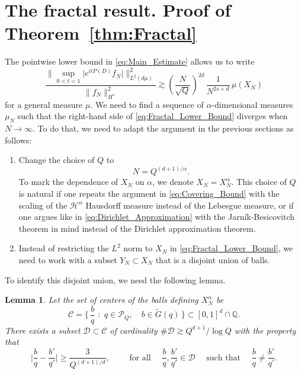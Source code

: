 \documentclass[11pt,reqno]{amsart}
\newtheorem{lem}[thm]{Lemma}
\theoremstyle{definition}
\numberwithin{equation}{section}
\theoremstyle{remark}
\begin{document}
\section{The fractal result. Proof of Theorem~\ref{thm:Fractal}}


The pointwise lower bound in \eqref{eq:Main_Estimate}
allows us to write
\begin{equation}\label{eq:Fractal_Lower_Bound}
    \frac{\Big\lVert \sup_{0<t<1} \big| e^{itP(D)}f_N \big| \Big\rVert_{L^2(d\mu)}^2}{\lVert f_N  \rVert_{H^s}^2}
    \gtrsim \left( \frac{N}{\sqrt{Q}} \right)^{2d} \, \frac{1}{N^{2s + d}} \, \mu(X_N)
\end{equation}
for a general measure $\mu$.
We need to find a sequence of $\alpha$-dimensional measures $\mu_N$
such that the right-hand side of \eqref{eq:Fractal_Lower_Bound} diverges when $N \to \infty$. 
To do that, we need to adapt the argument in the previous sections as follows:
\begin{enumerate}[1.]
    \item  Change the choice of $Q$ to
    \begin{equation}\label{eq:Fractal_Choice_Q}
        N = Q^{(d+1)/\alpha}.
    \end{equation}
    To mark the dependence of $X_N$ on $\alpha$,
    we denote $X_N = X_N^\alpha$.
    This choice of $Q$ is natural if one repeats the argument in \eqref{eq:Covering_Bound} with the scaling of the $\mathcal H^\alpha$ Hausdorff measure instead of the Lebesgue measure, 
    or if one argues like in \eqref{eq:Dirichlet_Approximation} with the Jarn\'ik-Besicovitch theorem in mind instead of the Dirichlet approximation theorem. 

    \item Instead of restricting the $L^2$ norm to $X_N$ in \eqref{eq:Fractal_Lower_Bound}, 
    we need to work with a subset $Y_N \subset X_N$ that is a disjoint union of balls. 
   
\end{enumerate}

To identify this disjoint union, we need the following lemma.
\begin{lem}\label{thm:Disjointness}
    Let the set of centers of the balls defining $X_N^\alpha$ be 
    \begin{equation}
        \mathcal C = \Big\{ \, \frac{b}{q} \, \, : \, \,  q \in \mathcal P_Q, \quad b \in \widetilde{G}(q)    \,   \Big\}
        \subset [0,1]^d \cap \mathbb Q.
    \end{equation}
    There exists a subset $\mathcal D \subset \mathcal C$
    of cardinality $\#\mathcal D \gtrsim  Q^{d+1}/\log Q$ with the property that 
    \begin{equation}
        \Big| \frac{b}{q} - \frac{b'}{q'}  \Big| \geq \frac{3}{Q^{(d+1)/d}}, 
        \qquad \text{ for all } \quad \frac{b}{q},  \frac{b'}{q'} \in \mathcal D \quad \text{ such that } \quad \frac{b}{q} \neq  \frac{b'}{q'} . 
    \end{equation}
\end{lem}
\end{document}
